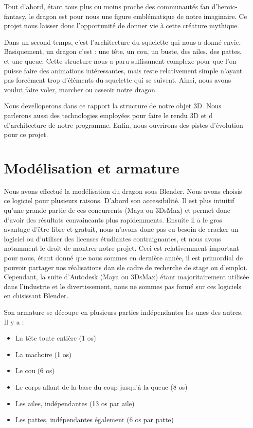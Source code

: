 \documentclass[a4paper]{report}
\begin{document}
Tout d'abord, étant tous plus ou moins proche des communautés fan d'heroic-fantasy, le dragon est pour nous une figure emblématique de notre imaginaire. Ce projet nous laisser donc l'opportunité de donner vie à cette créature mythique. 

Dans un second temps, c'est l'architecture du squelette qui nous a donné envie. Basiquement, un dragon c'est : une tête, un cou, un buste, des ailes, des pattes, et une queue. Cette structure nous a paru suffisament complexe pour que l'on puisse faire des animations intéressantes, mais reste relativement simple n'ayant pas forcément trop d'éléments du squelette qui se suivent. Ainsi, nous avons voulut faire voler, marcher ou asseoir notre dragon.

Nous develloperons dans ce rapport la structure de notre objet 3D. Nous parlerons aussi des technologies employées pour faire le rendu 3D et d el'architecture de notre programme. Enfin, nous ouvrirons des pistes d'évolution pour ce projet. 


\newpage
\chapter{Modélisation et armature}
\par
Nous avons effectué la modélisation du dragon sous Blender. Nous avons choisis ce logiciel pour plusieurs raisons. D'abord son accessibilité. Il est plus intuitif qu'une grande partie de ces concurrents (Maya ou 3DsMax) et permet donc d'avoir des résultats convaincants plus rapidemments. Ensuite il a le gros avantage d'être libre et gratuit, nous n'avons donc pas eu besoin de cracker un logiciel ou d'utiliser des licenses étudiantes contraignantes, et nous avons notamment le droit de montrer notre projet. Ceci est relativemment important pour nous, étant donné que nous sommes en dernière année, il est primordial de pouvoir partager nos réalisations dan sle cadre de recherche de stage ou d'emploi. Cependant, la suite d'Autodesk (Maya ou 3DsMax) étant majoritairement utilisée dans l'industrie et le divertissement, nous ne sommes pas formé sur ces logiciels en chisissant Blender.

Son armature se découpe en plusieurs parties indépendantes les unes des autres. Il y a :
\begin{itemize}
\item La tête toute entière (1 os)
\item La machoire (1 os)
\item Le cou (6 os)
\item Le corps allant de la base du coup jusqu'à la queue (8 os)
\item Les ailes, indépendantes (13 os par aile)
\item Les pattes, indépendantes également (6 os par patte)
\end{itemize}
\end{document}
